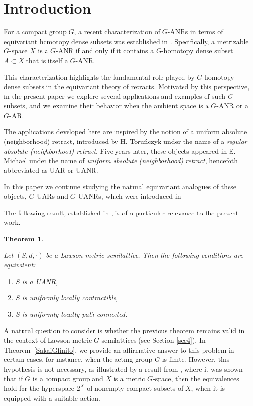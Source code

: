 \documentclass[12pt]{amsart}
\newtheorem{theorem}{Theorem}[section]
\theoremstyle{definition}
\begin{document}
	\section {Introduction}
	
	For a compact group $G$, a recent characterization of $G$-ANRs in terms of equivariant homotopy dense subsets was established in \cite{A8}. Specifically, a metrizable $G$-space $X$ is a $G$-ANR if and only if it contains a $G$-homotopy dense subset $A \subset X$ that is  itself  a $G$-ANR.
	
	This characterization highlights the fundamental role played by $G$-homotopy dense subsets in the equivariant theory of retracts. Motivated by this perspective, in the present paper we explore several applications and examples of such $G$-subsets, and we examine their behavior when the ambient space is a $G$-ANR or a $G$-AR.
	
	The applications developed here are inspired by the notion of a uniform absolute (neighborhood) retract, introduced by H. Toru\'nczyk \cite{HT2,HT3} under the name of a {\it regular absolute (neighborhood) retract}. Five years later,  these objects appeared in E. Michael \cite{EM1} under the name  of    \textit{uniform absolute (neighborhood) retract}, hencefoth abbreviated as UAR or UANR.
	
	\medskip
	
In this paper we continue studying the natural equivariant analogues of these objects, $G$-UARs and $G$-UANRs,  which were introduced  in \cite{A10}.	
	
\medskip
	
	The following result, established in \cite[Theorem 3.4]{KSakaiY}, is 
	of a particular relevance to the present work.
	
	\begin{theorem}\label{Sakai2005Teo3.4}
		\rm{Let $(S,d,\cdot)$ be a Lawson metric semilattice. Then the following conditions are equivalent:
			\begin{enumerate}
				\item [(i)] $S$ is a UANR,
				\item [(ii)] $S$ is uniformly locally contractible,
				\item [(iii)] $S$ is uniformly locally path-connected.
		\end{enumerate}}
	\end{theorem}
	
	A natural question to consider is whether the previous theorem remains valid in the context of Lawson metric $G$-semilattices (see Section \ref{sec4}). In Theorem~\ref{SakaiGfinito}, we provide an affirmative answer to this problem in certain cases, for instance, when the acting group $G$ is finite. However, this hypothesis is not necessary, as illustrated by a result from \cite{A10}, where it was shown that if $G$ is a compact group and $X$ is a metric $G$-space, then the equivalences hold for the hyperspace $2^X$ of nonempty compact subsets of $X$, when it is equipped with a suitable action.
	
\end{document}

